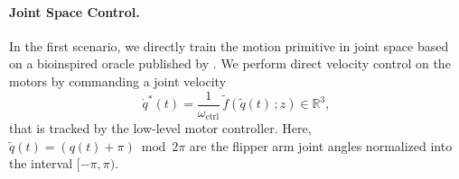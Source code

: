 \paragraph{Joint Space Control.} In the first scenario, we directly train the motion primitive in joint space based on a bioinspired oracle published by \citet{van2023soft}. 
We perform direct velocity control on the motors by commanding a joint velocity
\begin{equation}
    \dot{q}^*(t) = \frac{1}{\omega_\mathrm{ctrl}} \, \tilde{f}(\tilde{q}(t) \, ;z) \in \mathbb{R}^3,
\end{equation}
that is tracked by the low-level motor controller. Here, $\tilde{q}(t) = (q(t) + \pi) \bmod 2 \pi$ are the flipper arm joint angles normalized into the interval $[-\pi, \pi)$.

